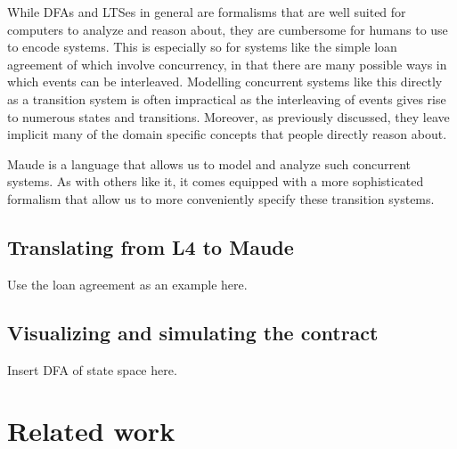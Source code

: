 \documentclass{article}
\begin{document}
While DFAs and LTSes in general are formalisms that are well suited for
computers to analyze and reason about, they are cumbersome for humans to use
to encode systems.
This is especially so for systems like the simple loan agreement of
\cite{contract_as_automaton} which involve concurrency, in that there are
many possible ways in which events can be interleaved.
Modelling concurrent systems like this directly as a transition system is
often impractical as the interleaving of events gives rise to numerous states
and transitions.
Moreover, as previously discussed, they leave implicit many of the domain
specific concepts that people directly reason about.

Maude is a language that allows us to model and analyze such concurrent systems.
As with others like it, it comes equipped with a more sophisticated formalism
that allow us to more conveniently specify these transition systems.

\subsection{Translating from L4 to Maude}
Use the loan agreement as an example here.

\subsection{Visualizing and simulating the contract}
Insert DFA of state space here.



\section{Related work}
\end{document}
